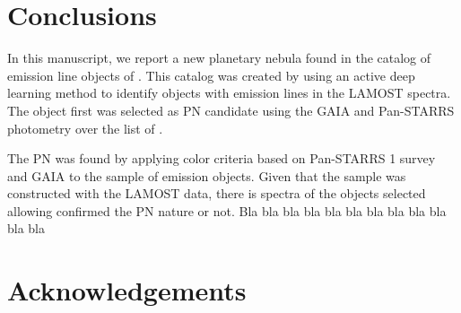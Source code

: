 \documentclass[fleqn,usenatbib]{mnras}
\begin{document}
\section{Conclusions}
\label{sec:conclu}

In this manuscript, we report a new planetary nebula found
in the catalog of emission line objects of \citet{Skoda:2020}.
This catalog was created by using an active deep learning method
to identify objects with emission lines in the LAMOST spectra.
The object first was selected as PN candidate using the GAIA
and Pan-STARRS photometry over the list of \citet{Skoda:2020}.

The PN was found by applying color criteria based on Pan-STARRS 1
 survey and GAIA to the sample of emission objects.
Given that the \citet{Skoda:2020} sample was constructed
with the LAMOST data, there is spectra of the objects selected
allowing confirmed the PN nature or not.
Bla bla bla bla bla bla bla bla bla bla bla bla

\section*{Acknowledgements}
\end{document}
